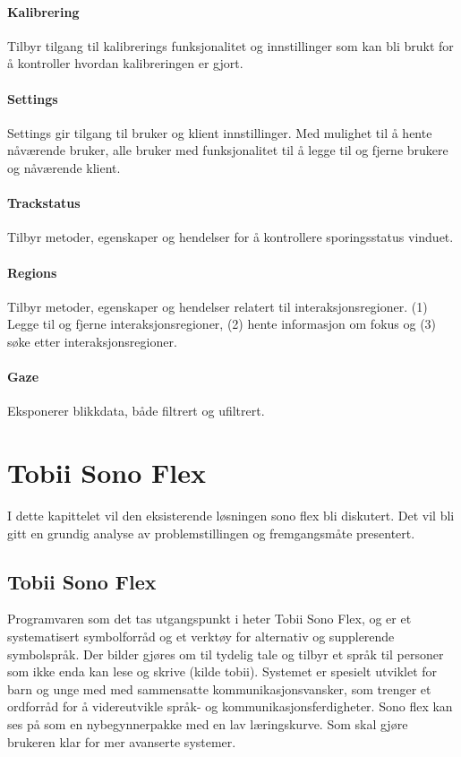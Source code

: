 \documentclass[phd,tocprelim]{cornell}
\begin{document}
\subsubsection{Kalibrering}
Tilbyr tilgang til kalibrerings funksjonalitet og innstillinger som kan bli brukt for å kontroller hvordan kalibreringen er gjort.

\subsubsection{Settings}
Settings gir tilgang til bruker og klient innstillinger. Med mulighet til å hente nåværende bruker, alle bruker med funksjonalitet til å legge til og fjerne brukere og nåværende klient.

\subsubsection{Trackstatus}
Tilbyr metoder, egenskaper og hendelser for å kontrollere sporingsstatus vinduet. 


\subsubsection{Regions}
Tilbyr metoder, egenskaper og hendelser relatert til interaksjonsregioner. (1) Legge til og fjerne interaksjonsregioner, (2) hente informasjon om fokus og (3) søke etter interaksjonsregioner.

\subsubsection{Gaze}
Eksponerer blikkdata, både filtrert og ufiltrert. 


\chapter{Tobii Sono Flex}

I dette kapittelet vil den eksisterende løsningen sono flex bli diskutert. Det vil bli gitt en grundig analyse av problemstillingen og fremgangsmåte presentert.


\section{Tobii Sono Flex}
\label{chap:Tobii-Sono-Flex}


Programvaren som det tas utgangspunkt i heter Tobii Sono Flex,  og er et systematisert symbolforråd og et verktøy for alternativ og supplerende symbolspråk.  Der bilder gjøres om til tydelig tale og tilbyr et språk til personer som ikke enda kan lese og skrive (kilde tobii). Systemet er spesielt utviklet for barn og unge med med sammensatte kommunikasjonsvansker, som trenger et ordforråd for å videreutvikle språk- og kommunikasjonsferdigheter. Sono flex kan ses på som en nybegynnerpakke med en lav læringskurve. Som skal gjøre brukeren klar for mer avanserte systemer. 
\end{document}
